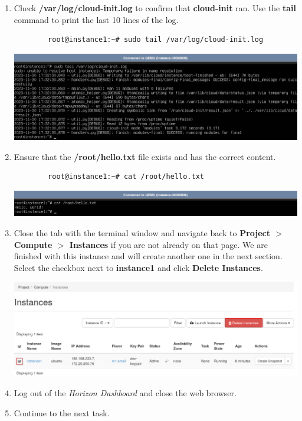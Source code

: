 \documentclass[letterpaper, 12pt]{article}
\begin{document}
\begin{enumerate}
    \item Check \textbf{/var/log/cloud-init.log} to confirm that \textbf{cloud-init} ran.
    Use the \textbf{tail} command to print the last 10 lines of the log.
    \begin{lstlisting}
        root@instance1:~# sudo tail /var/log/cloud-init.log
    \end{lstlisting}

    \begin{center}
        \includegraphics[width=\linewidth]{images/part2/step14.png}
    \end{center}

    \item Ensure that the \textbf{/root/hello.txt} file exists and has the correct content.
    \begin{lstlisting}
        root@instance1:~# cat /root/hello.txt
    \end{lstlisting}

    \begin{center}
        \includegraphics[width=\linewidth]{images/part2/step15.png}
    \end{center}

    \item Close the tab with the terminal window and navigate back to \textbf{Project $>$ Compute $>$ Instances} if you are not already on that page.
    We are finished with this instance and will create another one in the next section.
    Select the checkbox next to \textbf{instance1} and click \textbf{Delete Instances}.

    \begin{center}
        \includegraphics[width=\linewidth]{images/part2/step16.png}
    \end{center}

    \item Log out of the \textit{Horizon Dashboard} and close the web browser.

    \item Continue to the next task.

\end{enumerate}
\end{document}
